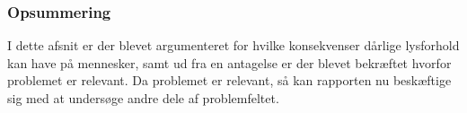\subsubsection{Opsummering}

I dette afsnit er der blevet argumenteret for hvilke konsekvenser dårlige lysforhold kan have på mennesker, samt ud fra en antagelse er der blevet bekræftet hvorfor problemet er relevant. \newline 
Da problemet er relevant, så kan rapporten nu beskæftige sig med at undersøge andre dele af problemfeltet. 
